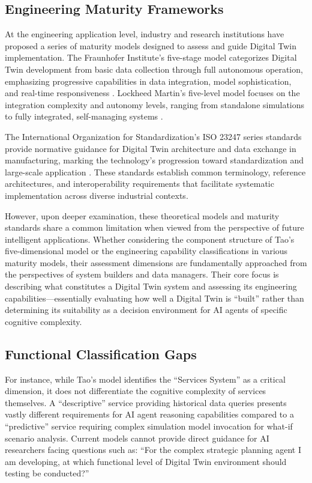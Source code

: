 \subsection{Engineering Maturity Frameworks}

At the engineering application level, industry and research institutions have proposed a series of maturity models designed to assess and guide Digital Twin implementation. The Fraunhofer Institute's five-stage model categorizes Digital Twin development from basic data collection through full autonomous operation, emphasizing progressive capabilities in data integration, model sophistication, and real-time responsiveness \cite{kritzinger2018digital}. Lockheed Martin's five-level model focuses on the integration complexity and autonomy levels, ranging from standalone simulations to fully integrated, self-managing systems \cite{rasheed2020digital}.

The International Organization for Standardization's ISO 23247 series standards provide normative guidance for Digital Twin architecture and data exchange in manufacturing, marking the technology's progression toward standardization and large-scale application \cite{iso23247}. These standards establish common terminology, reference architectures, and interoperability requirements that facilitate systematic implementation across diverse industrial contexts.

However, upon deeper examination, these theoretical models and maturity standards share a common limitation when viewed from the perspective of future intelligent applications. Whether considering the component structure of Tao's five-dimensional model or the engineering capability classifications in various maturity models, their assessment dimensions are fundamentally approached from the perspectives of system builders and data managers. Their core focus is describing what constitutes a Digital Twin system and assessing its engineering capabilities—essentially evaluating how well a Digital Twin is ``built'' rather than determining its suitability as a decision environment for AI agents of specific cognitive complexity.

\subsection{Functional Classification Gaps}

For instance, while Tao's model identifies the ``Services System'' as a critical dimension, it does not differentiate the cognitive complexity of services themselves. A ``descriptive'' service providing historical data queries presents vastly different requirements for AI agent reasoning capabilities compared to a ``predictive'' service requiring complex simulation model invocation for what-if scenario analysis. Current models cannot provide direct guidance for AI researchers facing questions such as: ``For the complex strategic planning agent I am developing, at which functional level of Digital Twin environment should testing be conducted?''

